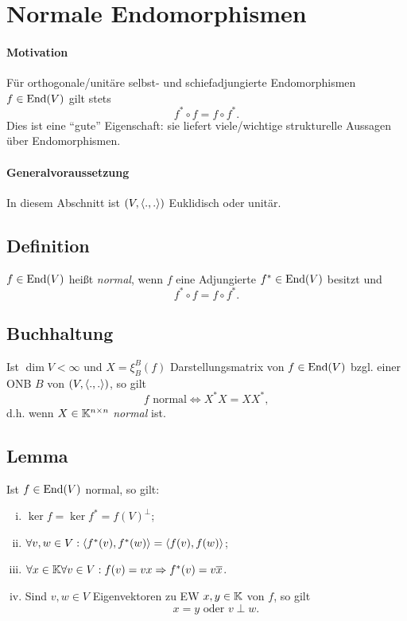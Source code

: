 \section{Normale Endomorphismen}
\paragraph{Motivation}
	Für orthogonale/unitäre selbst- und schiefadjungierte Endomorphismen $ f\in \operatorname{End}(V) $ gilt stets
		\[ f^*\circ f = f\circ f^*. \]
	Dies ist eine "`gute"' Eigenschaft: sie liefert viele/wichtige strukturelle Aussagen über Endomorphismen.
\paragraph{Generalvoraussetzung}
	In diesem Abschnitt ist $ (V,\langle .,. \rangle) $ Euklidisch oder unitär.

\subsection{Definition}
	$ f\in \operatorname{End}(V) $ heißt \emph{normal}, wenn $ f $ eine Adjungierte $ f^*\in \operatorname{End}(V) $ besitzt und 
		\[ f^*\circ f = f\circ f^*. \]
\subsection{Buchhaltung}
	Ist $ \dim V < \infty $ und $ X=\xi_B^B(f) $ Darstellungsmatrix von $ f\in \operatorname{End}(V) $ bzgl. einer ONB $ B $ von $ (V,\langle .,. \rangle) $, so gilt
		\[ f \text{ normal}\Leftrightarrow X^*X=XX^*, \]
	d.h. wenn $ X\in \mathbb{K}^{n\times n} $ \emph{normal} ist.
	
\subsection{Lemma}
	Ist $ f\in \operatorname{End}(V) $ normal, so gilt:
		\begin{enumerate}[(i)]
			\item $ \ker f = \ker f^* = f(V)^\perp $;
			\item $ \forall v,w\in V: \langle f^*(v),f^*(w) \rangle=\langle f(v),f(w) \rangle $;
			\item $ \forall x\in \mathbb{K}\forall v\in V: f(v) = vx \Rightarrow f^*(v) = v\overline{x} $.
			\item Sind $ v,w\in V $ Eigenvektoren zu EW $ x,y\in \mathbb{K} $ von $ f $, so gilt
				\[ x = y \text{ oder } v\perp w. \]
		\end{enumerate}
